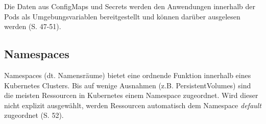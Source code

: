 \documentclass[11pt,a4paper]{article}
\begin{document}
% 

Die Daten aus ConfigMaps und Secrets werden den Anwendungen innerhalb der Pods als Umgebungsvariablen
bereitgestellt und können darüber ausgelesen werden \cite{Schmeling_Dargatz_2022} (S. 47-51).

\subsection{Namespaces}
Namespaces (dt. Namensräume) bietet eine ordnende Funktion innerhalb eines Kubernetes Clusters.
Bis auf wenige Ausnahmen (z.B. PersistentVolumes) sind die meisten Ressourcen in Kubernetes einem
Namespace zugeordnet. Wird dieser nicht explizit ausgewählt, werden Ressourcen automatisch dem
Namespace \emph{default} zugeordnet \cite{Schmeling_Dargatz_2022} (S. 52).
\end{document}
